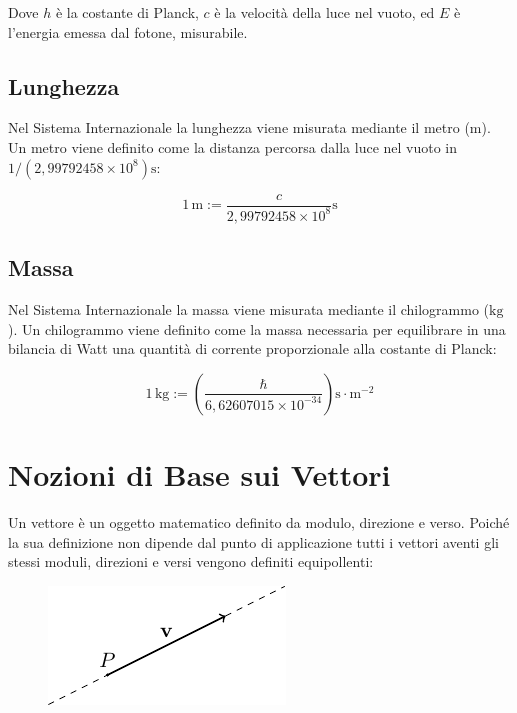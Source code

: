 \documentclass{article}
\numberwithin{equation}{subsection}
\begin{document}
Dove $h$ è la costante di Planck, $c$ è la velocità della luce nel vuoto, ed $E$ è l'energia emessa dal fotone, misurabile.

\subsection{Lunghezza}
Nel Sistema Internazionale la lunghezza viene misurata 
mediante il metro (m). Un metro viene definito come la 
distanza percorsa dalla luce nel vuoto in 
$1/\left(2{,}99792458\times 10^8\right)\mathrm{s}$:

\begin{equation*}
    1\,\mathrm{m} := \displaystyle\frac{c}{2{,}99792458\times 10^8}\mathrm{s}
\end{equation*}

\subsection{Massa}
Nel Sistema Internazionale la massa viene misurata mediante 
il chilogrammo ($\mathrm{kg}$). Un chilogrammo viene definito come la 
massa necessaria per equilibrare in una bilancia di Watt una 
quantità di corrente proporzionale alla costante di Planck:

\begin{equation*}
    1\,\mathrm{kg} := \left(\displaystyle\frac{\hbar}{ 6{,}62607015 \times 10^{-34}}\right){\mathrm{s}}\cdot{\mathrm{m}^{-2}}
\end{equation*}

\clearpage

\section{Nozioni di Base sui Vettori}
Un vettore è un oggetto matematico definito da modulo, direzione e verso. Poiché la sua definizione non dipende dal punto di applicazione tutti i vettori aventi gli stessi moduli, direzioni e versi vengono definiti equipollenti:

\begin{figure}[H]%
    \centering
    \includegraphics{vettore.pdf}%
\end{figure}
\end{document}
